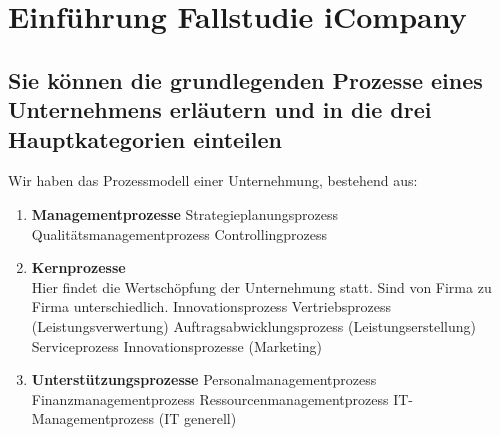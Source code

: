 \chapter{Einführung Fallstudie iCompany}

\section{Sie können die grundlegenden Prozesse eines Unternehmens erläutern und in die drei Hauptkategorien einteilen}
Wir haben das Prozessmodell einer Unternehmung, bestehend aus:
\begin{enumerate}
	\item \textbf{Managementprozesse}
		\subitem Strategieplanungsprozess
		\subitem Qualitätsmanagementprozess
		\subitem Controllingprozess
	\item \textbf{Kernprozesse} \\
		Hier findet die Wertschöpfung der Unternehmung statt. Sind von Firma zu Firma unterschiedlich.
		\subitem Innovationsprozess
		\subitem Vertriebsprozess (Leistungsverwertung)
		\subitem Auftragsabwicklungsprozess (Leistungserstellung)
		\subitem Serviceprozess
		\subitem Innovationsprozesse
		\subitem (Marketing)
	\item \textbf{Unterstützungsprozesse}
		\subitem Personalmanagementprozess
		\subitem Finanzmanagementprozess
		\subitem Ressourcenmanagementprozess
		\subitem IT-Managementprozess (IT generell)
\end{enumerate}
